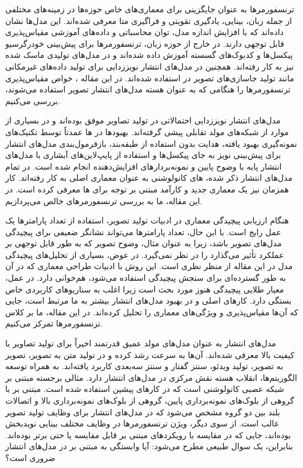 
\label{کارهای پیشین}
ترنسفورمرها به عنوان جایگزینی برای معماری‌های خاص حوزه‌ها در زمینه‌های مختلفی از جمله زبان، بینایی، یادگیری تقویتی و فراگیری متا معرفی شده‌اند. این مدل‌ها نشان داده‌اند که با افزایش اندازه مدل، توان محاسباتی و داده‌های آموزشی مقیاس‌پذیری قابل توجهی دارند. در خارج از حوزه زبان، ترنسفورمرها برای پیش‌بینی خودرگرسیو پیکسل‌ها و کدبوک‌های گسسته آموزش داده شده‌اند و در مدل‌های تولیدی ماسک شده نیز به کار رفته‌اند. همچنین در مدل‌های انتشار نویززدایی برای تولید داده‌های غیرمکانی مانند تولید جاسازی‌های تصویر  در  استفاده شده‌اند. در این مقاله ، خواص مقیاس‌پذیری ترنسفورمرها را هنگامی که به عنوان هسته مدل‌های انتشار تصویر استفاده می‌شوند، بررسی می‌کنیم.

مدل‌های انتشار نویززدایی احتمالاتی در تولید تصاویر موفق بوده‌اند و در بسیاری از موارد از شبکه‌های مولد تقابلی پیشی گرفته‌اند. بهبودها در ها عمدتاً توسط تکنیک‌های نمونه‌گیری بهبود یافته، هدایت بدون استفاده از طبقه‌بند، بازفرمول‌بندی مدل‌های انتشار برای پیش‌بینی نویز به جای پیکسل‌ها و استفاده از پایپ‌لاین‌های  آبشاری با مدل‌های انتشار پایه با وضوح پایین و نمونه‌بردارهای افزایش‌دهنده انجام شده است. در تمام مدل‌های انتشار ذکر شده، های کانولوشنی به عنوان معماری اصلی به کار رفته‌اند. کار همزمان نیز یک معماری جدید و کارآمد مبتنی بر توجه برای ها معرفی کرده است. در این مقاله، ما به بررسی ترنسفورمرهای خالص می‌پردازیم. 

هنگام ارزیابی پیچیدگی معماری در ادبیات تولید تصویر، استفاده از تعداد پارامترها یک عمل رایج است. با این حال، تعداد پارامترها می‌تواند نشانگر ضعیفی برای پیچیدگی مدل‌های تصویر باشد، زیرا به عنوان مثال، وضوح تصویر که به طور قابل توجهی بر عملکرد تأثیر می‌گذارد را در نظر نمی‌گیرد. در عوض، بسیاری از تحلیل‌های پیچیدگی مدل در این مقاله از منظر  نظری است. این روش با ادبیات طراحی معماری که در آن  به طور گسترده‌ای برای سنجش پیچیدگی استفاده می‌شود، هم‌خوانی دارد. در عمل، معیار طلایی پیچیدگی هنوز مورد بحث است زیرا اغلب به سناریوهای کاربردی خاص بستگی دارد. کارهای اصلی  و  در بهبود مدل‌های انتشار بیشتر به ما مرتبط است، جایی که آن‌ها مقیاس‌پذیری و ویژگی‌های  معماری  را تحلیل کرده‌اند. در این مقاله، ما بر کلاس ترنسفورمرها تمرکز می‌کنیم. 

مدل‌های انتشار به عنوان مدل‌های مولد عمیق قدرتمند اخیراً برای تولید تصاویر با کیفیت بالا معرفی شده‌اند. آن‌ها به سرعت رشد کرده و در تولید متن به تصویر، تصویر به تصویر، تولید ویدئو، سنتز گفتار و سنتز سه‌بعدی کاربرد یافته‌اند. به همراه توسعه الگوریتم‌ها، انقلاب هسته نقش مرکزی در مدل‌های انتشار دارد. مثالی برجسته  مبتنی بر شبکه عصبی کانولوشنی است که در کارهای پیشین استفاده شده است.  مبتنی بر  با گروهی از بلوک‌های نمونه‌برداری پایین، گروهی از بلوک‌های نمونه‌برداری بالا و اتصالات بلند بین دو گروه مشخص می‌شود که در مدل‌های انتشار برای وظایف تولید تصویر غالب است. از سوی دیگر، ویژن ترنسفورمرها در وظایف مختلف بینایی نویدبخش بوده‌اند، جایی که  در مقایسه با رویکردهای مبتنی بر  قابل مقایسه یا حتی برتر بوده‌اند. بنابراین، یک سوال طبیعی مطرح می‌شود: آیا وابستگی به  مبتنی بر  در مدل‌های انتشار ضروری است؟

